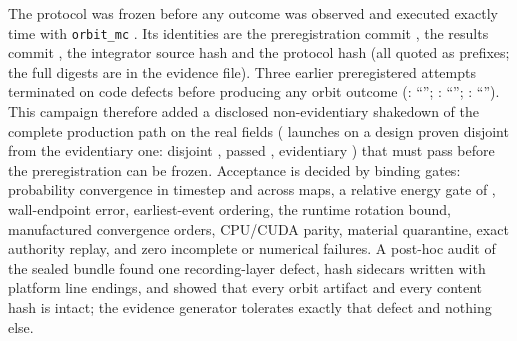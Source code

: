 The protocol was frozen before any outcome was observed and executed exactly
\WlfAttemptCount{} time with \texttt{orbit\_mc} \WlfOrbitMcVersion. Its identities are
the preregistration commit \texttt{\WlfPreregCommit}, the results commit
\texttt{\WlfResultsCommit}, the integrator source hash \texttt{\WlfOrbitMcSourceSha}
and the protocol hash \texttt{\WlfProtocolSha} (all quoted as prefixes; the full
digests are in the evidence file). Three earlier preregistered attempts terminated on
code defects before producing any orbit outcome (\texttt{\WlfVOneState}:
``\WlfVOneError''; \texttt{\WlfVTwoState}: ``\WlfVTwoError''; \texttt{\WlfVThreeState}:
``\WlfVThreeError''). This campaign therefore added a disclosed non-evidentiary
shakedown of the complete production path on the real fields
(\WlfShakedownLaunches{} launches on a design proven disjoint from the evidentiary
one: disjoint \WlfShakedownDisjoint, passed \WlfShakedownPassed, evidentiary
\WlfShakedownEvidentiary) that must pass before the preregistration can be frozen.
Acceptance is decided by \WlfGateCount{} binding gates: probability convergence in
timestep and across maps, a relative energy gate of \WlfEnergyGate, wall-endpoint
error, earliest-event ordering, the runtime rotation bound, manufactured convergence
orders, CPU/CUDA parity, material quarantine, exact authority replay, and zero
incomplete or numerical failures. A post-hoc audit of the sealed bundle found one
recording-layer defect, \WlfToleratedSidecars{} hash sidecars written with platform
line endings, and showed that every orbit artifact and every content hash is intact;
the evidence generator tolerates exactly that defect and nothing else.

